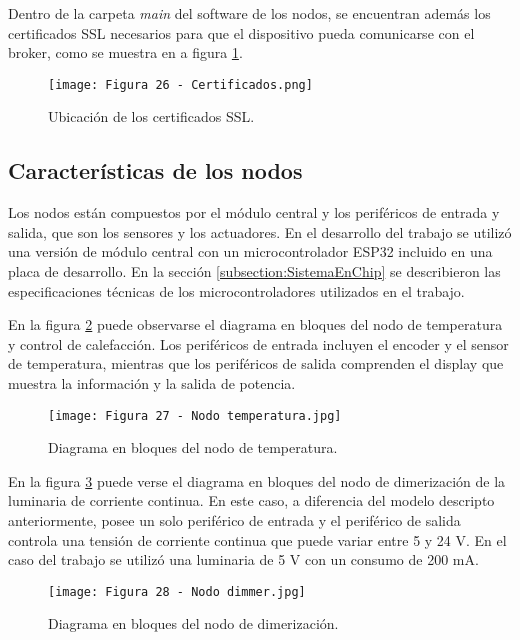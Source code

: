 Dentro de la carpeta \textit{main} del software de los nodos, se encuentran además los certificados SSL necesarios para que el dispositivo pueda comunicarse con el broker, como se muestra en a figura \ref{fig:26}.

\begin{figure}[h]
\centering
\texttt{[image: Figura 26 - Certificados.png]}
\caption[Ubicación de los certificados SSL]{Ubicación de los certificados SSL.}
\label{fig:26}
\end{figure}

\subsection{Características de los nodos}

Los nodos están compuestos por el módulo central y los periféricos de entrada y salida, que son los sensores y los actuadores. En el desarrollo del trabajo se utilizó una versión de módulo central con un microcontrolador ESP32 incluido en una placa de desarrollo. En la sección \ref{subsection:SistemaEnChip} se describieron las especificaciones técnicas de los microcontroladores utilizados en el trabajo.

En la figura \ref{fig:27} puede observarse el diagrama en bloques del nodo de temperatura y control de calefacción. Los periféricos de entrada incluyen el encoder y el sensor de temperatura, mientras que los periféricos de salida comprenden el display que muestra la información y la salida de potencia.

\newpage
\begin{figure}[h]
\centering
\texttt{[image: Figura 27 - Nodo temperatura.jpg]}
\caption[Diagrama en bloques del nodo de temperatura]{Diagrama en bloques del nodo de temperatura.}
\label{fig:27}
\end{figure}

En la figura \ref{fig:28} puede verse el diagrama en bloques del nodo de dimerización de la luminaria de corriente continua. En este caso, a diferencia del modelo descripto anteriormente, posee un solo periférico de entrada y el periférico de salida controla una tensión de corriente continua que puede variar entre 5 y 24 V. En el caso del trabajo se utilizó una luminaria de 5 V con un consumo de 200 mA.

\begin{figure}[h]
\centering
\texttt{[image: Figura 28 - Nodo dimmer.jpg]}
\caption[Diagrama en bloques del nodo de dimerización]{Diagrama en bloques del nodo de dimerización.}
\label{fig:28}
\end{figure}

